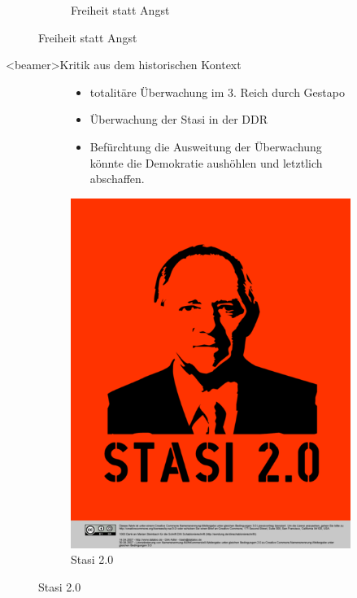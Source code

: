 \begin{frame}
\begin{figure}
\begin{subfigure}[b]{0.3\textwidth}
          \caption{Freiheit statt Angst}
          \label{fig:freiheit}
        \end{subfigure}
      \end{figure}
    \end{frame}

    \begin{frame}<beamer>{Kritik aus dem historischen Kontext}
      \begin{figure}
        \begin{subfigure}[b]{0.5\textwidth}
          \begin{itemize}
            \item totalitäre Überwachung im 3. Reich durch Gestapo
            \item Überwachung der Stasi in der DDR 
            \item Befürchtung die Ausweitung der Überwachung könnte die Demokratie aushöhlen und letztlich abschaffen.
          \end{itemize}
        \end{subfigure}
        \begin{subfigure}[b]{0.3\textwidth}
          \includegraphics[scale=0.2]{sections/img/stasi.png}
          \caption{Stasi 2.0}
          \label{fig:stasi}
        \end{subfigure}
      \end{figure}
    \end{frame}
